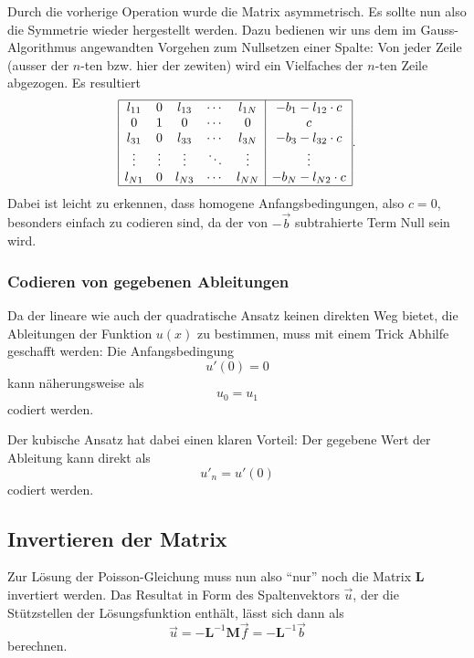 Durch die vorherige Operation wurde die Matrix asymmetrisch. 
Es sollte nun also die Symmetrie wieder hergestellt werden.
Dazu bedienen wir uns dem im Gauss-Algorithmus angewandten Vorgehen zum Nullsetzen einer Spalte: Von jeder Zeile (ausser der $n$-ten bzw. hier der zewiten) wird ein Vielfaches der $n$-ten Zeile abgezogen.
Es resultiert
\begin{equation}
        \begin{array}{|ccccc|c|}
            \hline
            l_{11} & 0      & l_{13} & \cdots & l_{1N} & -b_1 - l_{12} \cdot c \\
            0      & 1      & 0      & \cdots & 0      & c                     \\
            l_{31} & 0      & l_{33} & \cdots & l_{3N} & -b_3 - l_{32} \cdot c \\
            \vdots & \vdots & \vdots & \ddots & \vdots & \vdots                \\
            l_{N1} & 0      & l_{N3} & \cdots & l_{NN} & -b_N - l_{N2} \cdot c \\
            \hline
        \end{array}.
\end{equation}
Dabei ist leicht zu erkennen, dass homogene Anfangsbedingungen, also $c=0$, besonders einfach zu codieren sind, da der von $-\vec{b}$ subtrahierte Term Null sein wird.

\subsubsection{Codieren von gegebenen Ableitungen}
Da der lineare wie auch der quadratische Ansatz keinen direkten Weg bietet, die Ableitungen der Funktion $u(x)$ zu bestimmen, muss mit einem Trick Abhilfe geschafft werden: 
Die Anfangsbedingung
\begin{equation}
    u'(0) = 0
\end{equation}
kann näherungsweise als 
\begin{equation}
    u_0 = u_1
\end{equation}
codiert werden. 

Der kubische Ansatz hat dabei einen klaren Vorteil: 
Der gegebene Wert der Ableitung kann direkt als 
\begin{equation}
    u'_n = u'(0)
\end{equation}
codiert werden.


\subsection{Invertieren der Matrix\label{fem:1d:matrix_invertieren}}
Zur Lösung der Poisson-Gleichung muss nun also ``nur'' noch die Matrix $\mathbf{L}$ invertiert werden.
Das Resultat in Form des Spaltenvektors $\vec{u}$, der die Stützstellen der Lösungsfunktion enthält, lässt sich dann als
\begin{equation}
    \vec{u} = - \mathbf{L}^{-1}\mathbf{M}\vec{f} = - \mathbf{L}^{-1}\vec{b}
\end{equation}
berechnen.

